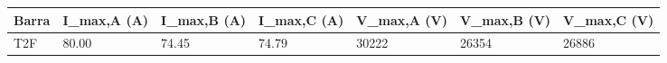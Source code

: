 \begin{tabular}{lllllll}
\toprule
Barra & I_{max,A} (A) & I_{max,B} (A) & I_{max,C} (A) & V_{max,A} (V) & V_{max,B} (V) & V_{max,C} (V) \\
\midrule
T2F & 80.00 & 74.45 & 74.79 & 30222 & 26354 & 26886 \\
\bottomrule
\end{tabular}
